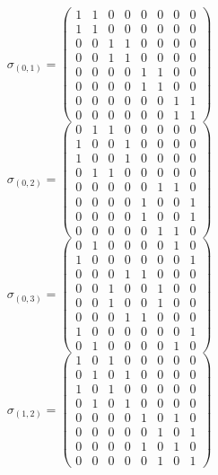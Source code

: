 \documentclass[8pt]{article}\usepackage{amsmath}
\begin{document}
 \[ \sigma_{(0, 1)}= \left(\begin{array}{rrrrrrrr}
1 & 1 & 0 & 0 & 0 & 0 & 0 & 0 \\
1 & 1 & 0 & 0 & 0 & 0 & 0 & 0 \\
0 & 0 & 1 & 1 & 0 & 0 & 0 & 0 \\
0 & 0 & 1 & 1 & 0 & 0 & 0 & 0 \\
0 & 0 & 0 & 0 & 1 & 1 & 0 & 0 \\
0 & 0 & 0 & 0 & 1 & 1 & 0 & 0 \\
0 & 0 & 0 & 0 & 0 & 0 & 1 & 1 \\
0 & 0 & 0 & 0 & 0 & 0 & 1 & 1
\end{array}\right)  \]
 \[ \sigma_{(0, 2)}= \left(\begin{array}{rrrrrrrr}
0 & 1 & 1 & 0 & 0 & 0 & 0 & 0 \\
1 & 0 & 0 & 1 & 0 & 0 & 0 & 0 \\
1 & 0 & 0 & 1 & 0 & 0 & 0 & 0 \\
0 & 1 & 1 & 0 & 0 & 0 & 0 & 0 \\
0 & 0 & 0 & 0 & 0 & 1 & 1 & 0 \\
0 & 0 & 0 & 0 & 1 & 0 & 0 & 1 \\
0 & 0 & 0 & 0 & 1 & 0 & 0 & 1 \\
0 & 0 & 0 & 0 & 0 & 1 & 1 & 0
\end{array}\right)  \]
 \[ \sigma_{(0, 3)}= \left(\begin{array}{rrrrrrrr}
0 & 1 & 0 & 0 & 0 & 0 & 1 & 0 \\
1 & 0 & 0 & 0 & 0 & 0 & 0 & 1 \\
0 & 0 & 0 & 1 & 1 & 0 & 0 & 0 \\
0 & 0 & 1 & 0 & 0 & 1 & 0 & 0 \\
0 & 0 & 1 & 0 & 0 & 1 & 0 & 0 \\
0 & 0 & 0 & 1 & 1 & 0 & 0 & 0 \\
1 & 0 & 0 & 0 & 0 & 0 & 0 & 1 \\
0 & 1 & 0 & 0 & 0 & 0 & 1 & 0
\end{array}\right)  \]
 \[ \sigma_{(1, 2)}= \left(\begin{array}{rrrrrrrr}
1 & 0 & 1 & 0 & 0 & 0 & 0 & 0 \\
0 & 1 & 0 & 1 & 0 & 0 & 0 & 0 \\
1 & 0 & 1 & 0 & 0 & 0 & 0 & 0 \\
0 & 1 & 0 & 1 & 0 & 0 & 0 & 0 \\
0 & 0 & 0 & 0 & 1 & 0 & 1 & 0 \\
0 & 0 & 0 & 0 & 0 & 1 & 0 & 1 \\
0 & 0 & 0 & 0 & 1 & 0 & 1 & 0 \\
0 & 0 & 0 & 0 & 0 & 1 & 0 & 1
\end{array}\right)  \]
\end{document}
